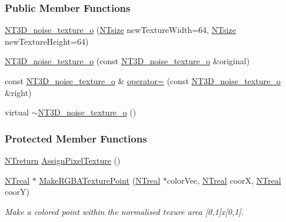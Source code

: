 \subsubsection*{Public Member Functions}
\begin{DoxyCompactItemize}
\item 
\hyperlink{class_n_t3_d__noise__texture__o_a1d848f083043529708f2d575c9d31b3d}{NT3D\_\-noise\_\-texture\_\-o} (\hyperlink{nt__types_8h_a06c124f2e4469769b58230253ce0560b}{NTsize} newTextureWidth=64, \hyperlink{nt__types_8h_a06c124f2e4469769b58230253ce0560b}{NTsize} newTextureHeight=64)
\item 
\hyperlink{class_n_t3_d__noise__texture__o_a3a199a869833324c573006587d5efe92}{NT3D\_\-noise\_\-texture\_\-o} (const \hyperlink{class_n_t3_d__noise__texture__o}{NT3D\_\-noise\_\-texture\_\-o} \&original)
\item 
const \hyperlink{class_n_t3_d__noise__texture__o}{NT3D\_\-noise\_\-texture\_\-o} \& \hyperlink{class_n_t3_d__noise__texture__o_a20928286ea3b77d568e93158d37acbba}{operator=} (const \hyperlink{class_n_t3_d__noise__texture__o}{NT3D\_\-noise\_\-texture\_\-o} \&right)
\item 
virtual \hyperlink{class_n_t3_d__noise__texture__o_a06b9e169ec6540c7a7e1288047570ac5}{$\sim$NT3D\_\-noise\_\-texture\_\-o} ()
\end{DoxyCompactItemize}
\subsubsection*{Protected Member Functions}
\begin{DoxyCompactItemize}
\item 
\hyperlink{nt__types_8h_ab9564ee8f091e809d21b8451c6683c53}{NTreturn} \hyperlink{class_n_t3_d__noise__texture__o_ae18c90e063e33fe36e7da89d789a5487}{AssignPixelTexture} ()
\item 
\hyperlink{nt__types_8h_a814a97893e9deb1eedcc7604529ba80d}{NTreal} $\ast$ \hyperlink{class_n_t3_d__noise__texture__o_abc9dc3b9179012715e907b8b9cb9f6aa}{MakeRGBATexturePoint} (\hyperlink{nt__types_8h_a814a97893e9deb1eedcc7604529ba80d}{NTreal} $\ast$colorVec, \hyperlink{nt__types_8h_a814a97893e9deb1eedcc7604529ba80d}{NTreal} coorX, \hyperlink{nt__types_8h_a814a97893e9deb1eedcc7604529ba80d}{NTreal} coorY)
\begin{DoxyCompactList}\small\item\em Make a colored point within the normalised texure area \mbox{[}0,1\mbox{]}x\mbox{[}0,1\mbox{]}. \item\end{DoxyCompactList}\end{DoxyCompactItemize}


